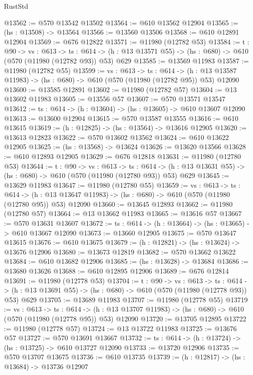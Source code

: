 \begin{lexlean}{RustStd}
\begin{coremodule}
@13562 := @570 @13542 @13502
@13564 := @610 @13562 @12904
@13565 := (hs : @13508) -> @13564
@13566 := @13560 @13506
@13568 := @610 @12891 @12904
@13569 := @676 @12822
@13571 := @11980 (@12782 @53)
@13584 := {t : @90} ->
  {vs : @613} ->
  {ts : @614} -> (h : @13 @13571 @55) -> (hs : @680) -> @610 (@570 (@11980 (@12782 @93)) @53) @629
@13585 := @13569 @11983
@13587 := @11980 (@12782 @55)
@13599 := {vs : @613} ->
  {ts : @614} ->
  (h : @13 @13587 @11983) -> (hs : @680) -> @610 (@570 (@11980 (@12782 @95)) @53) @12090
@13600 := @13585 @12891
@13602 := @11980 (@12782 @57)
@13604 := @13 @13602 @11983
@13605 := @13556 @57
@13607 := @570 @13571 @13547
@13612 := {ts : @614} -> (h : @13604) -> (hs : @13605) -> @610 @13607 @12090
@13613 := @13600 @12904
@13615 := @570 @13587 @13555
@13616 := @610 @13615
@13619 := (h : @12825) -> (hs : @13564) -> @13616 @12905
@13620 := @13613 @12823
@13622 := @570 @13602 @13562
@13624 := @610 @13622 @12905
@13625 := (hs : @13568) -> @13624
@13626 := @13620 @13566
@13628 := @610 @12893 @12905
@13629 := @676 @12818
@13631 := @11980 (@12780 @53)
@13644 := {t : @90} ->
  {vs : @613} ->
  {ts : @614} -> (h : @13 @13631 @55) -> (hs : @680) -> @610 (@570 (@11980 (@12780 @93)) @53) @629
@13645 := @13629 @11983
@13647 := @11980 (@12780 @55)
@13659 := {vs : @613} ->
  {ts : @614} ->
  (h : @13 @13647 @11983) -> (hs : @680) -> @610 (@570 (@11980 (@12780 @95)) @53) @12090
@13660 := @13645 @12893
@13662 := @11980 (@12780 @57)
@13664 := @13 @13662 @11983
@13665 := @13616 @57
@13667 := @570 @13631 @13607
@13672 := {ts : @614} -> (h : @13664) -> (hs : @13665) -> @610 @13667 @12090
@13673 := @13660 @12905
@13675 := @570 @13647 @13615
@13676 := @610 @13675
@13679 := (h : @12821) -> (hs : @13624) -> @13676 @12906
@13680 := @13673 @12819
@13682 := @570 @13662 @13622
@13684 := @610 @13682 @12906
@13685 := (hs : @13628) -> @13684
@13686 := @13680 @13626
@13688 := @610 @12895 @12906
@13689 := @676 @12814
@13691 := @11980 (@12778 @53)
@13704 := {t : @90} ->
  {vs : @613} ->
  {ts : @614} -> (h : @13 @13691 @55) -> (hs : @680) -> @610 (@570 (@11980 (@12778 @93)) @53) @629
@13705 := @13689 @11983
@13707 := @11980 (@12778 @55)
@13719 := {vs : @613} ->
  {ts : @614} ->
  (h : @13 @13707 @11983) -> (hs : @680) -> @610 (@570 (@11980 (@12778 @95)) @53) @12090
@13720 := @13705 @12895
@13722 := @11980 (@12778 @57)
@13724 := @13 @13722 @11983
@13725 := @13676 @57
@13727 := @570 @13691 @13667
@13732 := {ts : @614} -> (h : @13724) -> (hs : @13725) -> @610 @13727 @12090
@13733 := @13720 @12906
@13735 := @570 @13707 @13675
@13736 := @610 @13735
@13739 := (h : @12817) -> (hs : @13684) -> @13736 @12907

\end{coremodule}
\end{lexlean}
